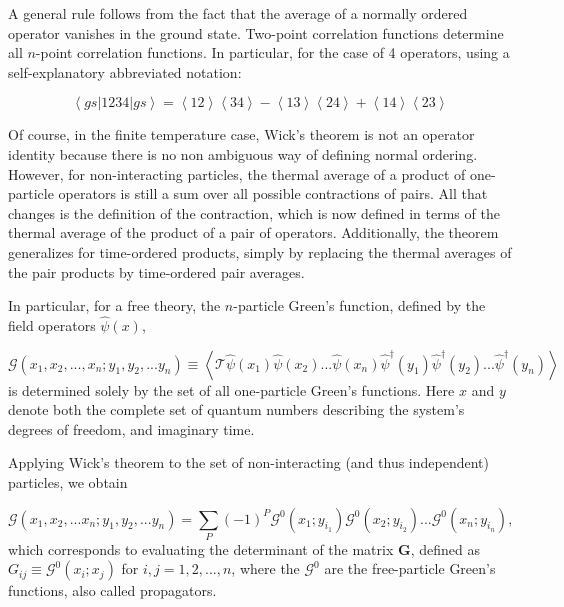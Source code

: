 A general rule follows from the fact that the average of a normally ordered operator vanishes in the ground state.
Two-point correlation functions determine all $n$-point correlation functions.
In particular, for the case of 4 operators, using a self-explanatory abbreviated notation:

\begin{equation}
\left\langle gs | 1234 | gs \right\rangle = \left\langle 12 \right\rangle \left\langle 34 \right\rangle - \left\langle 13 \right\rangle \left\langle 24 \right\rangle + \left\langle 14 \right\rangle \left\langle 23 \right\rangle
\end{equation}

Of course, in the finite temperature case, Wick's theorem is not an operator identity because there is no non ambiguous way of defining normal ordering.
However, for non-interacting particles, the thermal average of a product of one-particle operators is still a sum over all possible contractions of pairs.
All that changes is the definition of the contraction, which is now defined in terms of the thermal average of the product of a pair of operators.
Additionally, the theorem generalizes for time-ordered products, simply by replacing the thermal averages of the pair products by time-ordered pair averages.

In particular, for a free theory, the $n$-particle Green's function, defined by the field operators $\hat{\psi} ( x )$,

\begin{equation}
\mathcal{G} ( x_1, x_2, ..., x_n; y_1, y_2, ... y_n ) \equiv \left\langle \mathcal{T} \hat{\psi} ( x_1 ) \hat{\psi} ( x_2 ) ... \hat{\psi} ( x_n ) \hat{\psi}^\dagger ( y_1 ) \hat{\psi}^\dagger ( y_2 ) ... \hat{\psi}^\dagger ( y_n ) \right\rangle
\end{equation}
is determined solely by the set of all one-particle Green's functions.
Here $x$ and $y$ denote both the complete set of quantum numbers describing the system's degrees of freedom, and imaginary time.

Applying Wick's theorem to the set of non-interacting (and thus independent) particles, we obtain

\begin{equation}
\mathcal{G} ( x_1, x_2, ... x_n; y_1, y_2,... y_n ) = \sum_P (- 1 )^P \mathcal{G}^0 ( x_1; y_{i_1} ) \mathcal{G}^0 ( x_2; y_{i_2} ) ... \mathcal{G}^0 ( x_n; y_{i_n} ) ,
\end{equation}
which corresponds to evaluating the determinant of the matrix $\bm G$, defined as $G_{ij} \equiv \mathcal{G}^0 ( x_i ; x_j )$ for $i, j = 1, 2, ..., n$, where the $\mathcal{G}^0$ are the free-particle Green's functions, also called propagators.